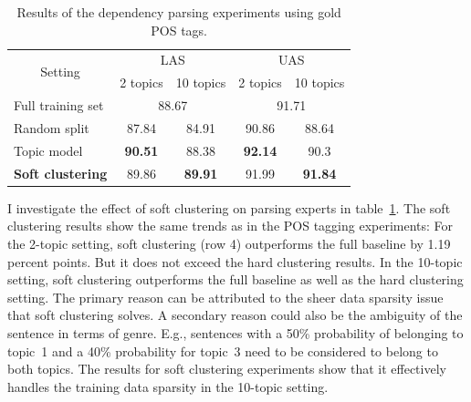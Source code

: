\begin{table}[t!]
	\centering
	\begin{tabular}{l|cc|cc}
		\multicolumn{1}{c|}{\multirow{2}{*}{Setting}} & \multicolumn{2}{c|}{LAS}                                      & \multicolumn{2}{c}{UAS}                                     \\
		\multicolumn{1}{c|}{}                         & \multicolumn{1}{l}{2 topics} & \multicolumn{1}{r|}{10 topics} & \multicolumn{1}{l}{2 topics} & \multicolumn{1}{r}{10 topics} \\ \hline
		Full training set                             & \multicolumn{2}{c|}{88.67}                                    & \multicolumn{2}{c}{91.71}                                   \\
		Random split                                  & 87.84                        & 84.91                          & 90.86                        & 88.64                         \\
		Topic model                                   & \textbf{90.51}               & 88.38                          & \textbf{92.14}               & 90.3                          \\ 
		\textbf{Soft clustering}                               & 89.86                        & \textbf{89.91}                 & 91.99                        & \textbf{91.84}                \\ \hline
	\end{tabular}
	\caption{Results of the dependency parsing experiments using gold POS tags.}
	\label{tab:parsingsoftcluster}
\end{table}


I investigate the effect of soft clustering on parsing experts in table~\ref{tab:parsingsoftcluster}. The soft clustering results show the same trends as in the POS tagging experiments:  For the 2-topic setting, soft clustering (row 4) outperforms the full baseline by 1.19 percent points. But it does not exceed the hard clustering results.  In the 10-topic setting, soft clustering outperforms the full baseline as well as the hard clustering setting. The primary reason can be attributed to the sheer data sparsity issue that soft clustering solves. A secondary reason could also be the ambiguity of the sentence in terms of genre. E.g., sentences with a 50\% probability of belonging to topic~1 and a 40\% probability for topic~3 need to be considered to belong to both topics. The results for soft clustering experiments show that it effectively handles the training data sparsity in the 10-topic setting.

